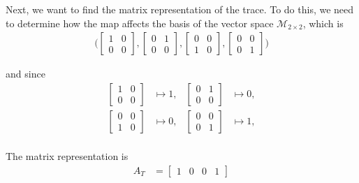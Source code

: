 \begin{example}
Next, we want to find the matrix representation of the trace.  To do this, we need to determine how the map affects the basis of the vector space $\mathcal{M}_{2 \times 2}$, which is 
%
\begin{align*}
\bigl( \begin{bmatrix}
1 & 0 \\ 0 & 0 
\end{bmatrix}, \begin{bmatrix}
0 & 1 \\ 0 & 0 
\end{bmatrix}, \begin{bmatrix}
0 & 0 \\ 1 & 0 
\end{bmatrix}, \begin{bmatrix}
0 & 0 \\ 0 & 1 
\end{bmatrix} \bigr) 
\end{align*}

and since
%
\begin{align*}
\begin{bmatrix}
1 & 0 \\ 0 & 0 
\end{bmatrix} &\mapsto 1, &
\begin{bmatrix}
0 & 1 \\ 0 & 0 
\end{bmatrix} &\mapsto 0, \\
\begin{bmatrix}
0 & 0 \\ 1 & 0 
\end{bmatrix} &\mapsto 0, &
\begin{bmatrix}
0 & 0 \\ 0 & 1 
\end{bmatrix} &\mapsto 1, \\
\end{align*}

The matrix representation is 
%
\begin{align*}
A_T & = \begin{bmatrix}
1 & 0 & 0 & 1 
\end{bmatrix}
\end{align*}
\end{example}

